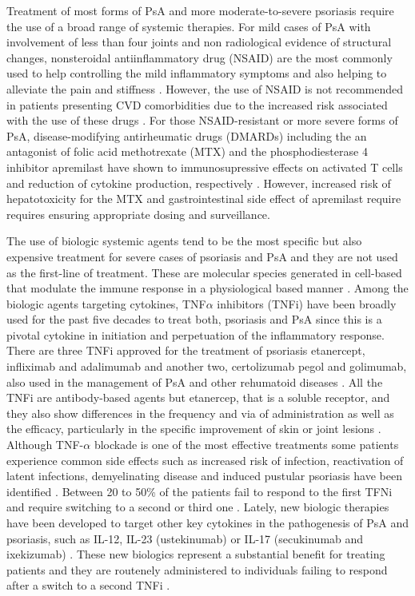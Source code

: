 {Treatment of most forms of PsA and more moderate-to-severe psoriasis require the use of a broad range of systemic therapies. For mild cases of PsA with involvement of less than four joints and non radiological evidence of structural changes, nonsteroidal antiinflammatory drug (NSAID) are the most commonly used to help controlling the mild inflammatory symptoms and also helping to alleviate the pain and stiffness \parencite{Coates2016}. However, the use of NSAID is not recommended in patients presenting CVD comorbidities due to the increased risk associated with the use of these drugs \parencite{Bhala2013}. For those NSAID-resistant or more severe forms of PsA, disease-modifying antirheumatic drugs (DMARDs) including the an antagonist of folic acid methotrexate (MTX) and the phosphodiesterase 4 inhibitor apremilast have shown to immunosupressive effects on activated T cells and reduction of cytokine production, respectively \parencite{Schmitt2014, Gossec2016, Keating2017,Polachek2017}. However, increased risk of hepatotoxicity for the MTX  and gastrointestinal side effect  of apremilast  require requires ensuring appropriate dosing and surveillance. 


The use of biologic systemic agents tend to be the most specific but also expensive treatment for severe cases of psoriasis and PsA and they are not used as the first-line of treatment. These are molecular species generated in cell-based that modulate the immune response in a physiological based manner \parencite{Perera2012}. Among the biologic agents targeting cytokines, TNF$\alpha$ inhibitors (TNFi) have been broadly used for the past five decades to treat both, psoriasis and PsA since this is a pivotal cytokine in initiation and perpetuation of the inflammatory response. There are three TNFi approved for the treatment of psoriasis etanercept, infliximab and adalimumab \parencite{Ahil2016} and another two, certolizumab pegol and golimumab, also used in the management of PsA and other rehumatoid diseases  \parencite{Coates2016b}. All the TNFi are antibody-based agents but etanercep, that is a soluble receptor, and they also show differences in the frequency and via of administration as well as the efficacy, particularly in the specific improvement of skin or joint lesions \parencite{Mease2000}. Although TNF-$\alpha$ blockade is one of the most effective treatments some patients experience common side effects such as increased risk of infection, reactivation of latent infections, demyelinating disease and induced pustular psoriasis have been identified \parencite{Nickoloff2004}. Between 20 to 50\% of the patients fail to respond to the first TFNi and require switching to a second or third one \parencite{Abramson2016}. Lately, new biologic therapies have been developed to target other key cytokines in the pathogenesis of PsA and psoriasis, such as IL-12, IL-23 (ustekinumab) or  IL-17 (secukinumab and ixekizumab) \parencite{Mahil2016}. These new biologics represent a substantial benefit for treating patients and they are routenely administered to individuals failing to respond after a switch to a second TNFi \parencite{Coates2016b}.
 

}
